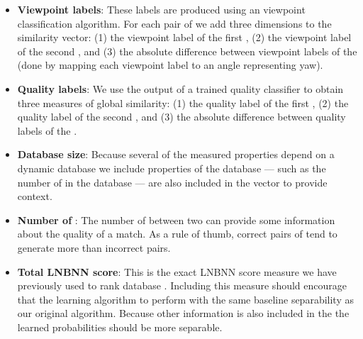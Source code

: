             \begin{itemize}

                \item \textbf{Viewpoint labels}:
                    These labels are produced using an \annot{} viewpoint
                      classification algorithm.
                    For each pair of \annots{} we add three dimensions to the
                      similarity vector:
                    (1) the viewpoint label of the first \annot{},
                    (2) the viewpoint label of the second \annot{}, and
                    (3) the absolute difference between viewpoint labels of
                      the \annots{} (done by mapping each viewpoint label to an
                      angle representing yaw).

                \item \textbf{Quality labels}:
                    We use the output of a trained \annot{} quality classifier
                      to obtain three measures of global similarity:
                    (1) the quality label of the first \annot{},
                    (2) the quality label of the second \annot{}, and
                    (3) the absolute difference between quality labels of the
                      \annots{}.

                \item \textbf{Database size}:
                    Because several of the measured properties depend on a
                      dynamic database we include properties of the database ---
                      such as the number of \annots{} in the database --- are
                      also included in the vector to provide context.

                \item \textbf{Number of \correspondences{}}:
                    The number of \correspondences{} between two \annots{} can
                      provide some information about the quality of a match.
                    As a rule of thumb, correct pairs of \annots{} tend to
                      generate more \correspondences{} than incorrect pairs.

                \item \textbf{Total LNBNN score}:
                    This is the exact LNBNN score measure we have previously
                      used to rank database \annots{}.
                    Including this measure should encourage that the learning
                      algorithm to perform with the same baseline separability
                      as our original algorithm.
                    Because other information is also included in the
                      \matchvec{} the learned probabilities should be more
                      separable.

            \end{itemize}

